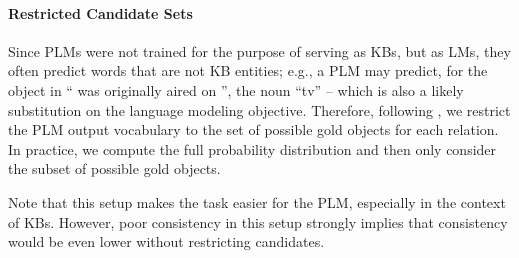 
\paragraph{Restricted Candidate Sets}
Since PLMs were not trained for the purpose of
serving as KBs, but as LMs, they often predict words
that are not KB entities;
e.g., a PLM may predict, for the object in ``\subj{}
was originally aired on \obj{}'', the noun
``tv'' --  which is also a likely substitution on the language
modeling objective.
Therefore,
following \citep{Xiong2020Pretrained, nora@@},
we
restrict the PLM output vocabulary to the set of possible gold objects for each
relation. In practice, we compute the full probability
distribution and then only consider the subset of possible
gold objects.

Note that this setup makes the task easier for the PLM,
especially in the context of KBs. However, poor
consistency in this setup strongly implies that consistency
would be even lower without restricting candidates.
